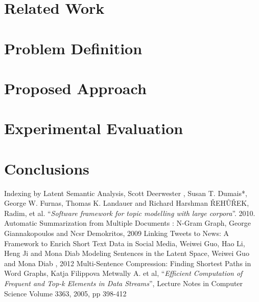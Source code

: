 \documentclass{acm_proc_article-sp-sigmod07}
\begin{document}
\section*{Related Work}


\section*{Problem Definition}


\section*{Proposed Approach}


\section*{Experimental Evaluation}


\section*{Conclusions}

\begin{thebibliography}{9}
	Indexing by Latent Semantic Analysis, Scott Deerwester , Susan T. Dumais*, George W. Furnas,  Thomas K. Landauer  and Richard Harshman 
  ŘEHŮŘEK, Radim, et al. ``\emph{Software framework for topic modelling with large corpora}''. 2010.
	Automatic Summarization from Multiple Documents : N-Gram Graph, George Giannakopoulos and Ncsr Demokritos, 2009
	Linking Tweets to News: A Framework to Enrich Short Text Data in Social Media, Weiwei Guo, Hao Li, Heng Ji and Mona Diab
	Modeling Sentences in the Latent Space, Weiwei Guo and Mona Diab , 2012
	Multi-Sentence Compression: Finding Shortest Paths in Word Graphs, Katja Filippova 
	Metwally A. et al, ``\emph{Efficient Computation of Frequent and Top-k
	Elements in Data Streams}'', Lecture Notes in Computer Science Volume 3363, 2005, pp 398-412

\end{thebibliography}
\end{document}
